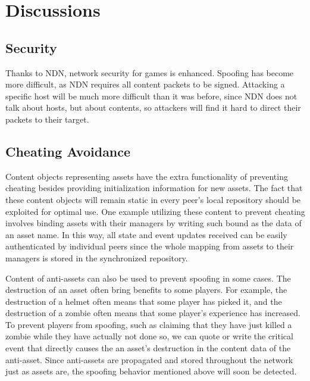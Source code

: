\chapter{Discussions}
\label{discussions}

\section{Security}
Thanks to NDN, network security for games is enhanced. Spoofing has become more difficult, as NDN requires all content packets to be signed. Attacking a specific host will be much more difficult than it was before, since NDN does not talk about hosts, but about contents, so attackers will find it hard to direct their packets to their target.


\section{Cheating Avoidance}



Content objects representing assets have the extra functionality of preventing cheating besides providing initialization information for new assets. The fact that these content objects will remain static in every peer's local repository should be exploited for optimal use. One example utilizing these content to prevent cheating involves binding assets with their managers by writing such bound as the data of an asset name. In this way, all state and event updates received can be easily authenticated by individual peers since the whole mapping from assets to their managers is stored in the synchronized repository.

Content of anti-assets can also be used to prevent spoofing in some cases. The destruction of an asset often bring benefits to some players. For example, the destruction of a helmet often means that some player has picked it, and the destruction of a zombie often means that some player's experience has increased. To prevent players from spoofing, such as claiming that they have just killed a zombie while they have actually not done so, we can quote or write the critical event that directly causes the an asset's destruction in the content data of the anti-asset. Since anti-assets are propagated and stored throughout the network just as assets are, the spoofing behavior mentioned above will soon be detected. 
